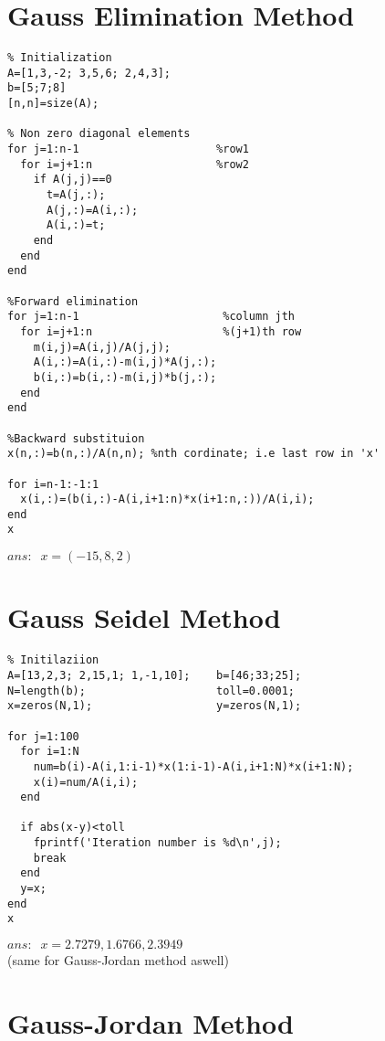 \section{Gauss Elimination Method}

\begin{verbatim}
% Initialization
A=[1,3,-2; 3,5,6; 2,4,3];
b=[5;7;8]
[n,n]=size(A);

% Non zero diagonal elements
for j=1:n-1                     %row1
  for i=j+1:n                   %row2
    if A(j,j)==0
      t=A(j,:);
      A(j,:)=A(i,:);
      A(i,:)=t;
    end
  end
end

%Forward elimination
for j=1:n-1                      %column jth
  for i=j+1:n                    %(j+1)th row
    m(i,j)=A(i,j)/A(j,j);
    A(i,:)=A(i,:)-m(i,j)*A(j,:);
    b(i,:)=b(i,:)-m(i,j)*b(j,:);
  end
end

%Backward substituion
x(n,:)=b(n,:)/A(n,n); %nth cordinate; i.e last row in 'x'

for i=n-1:-1:1
  x(i,:)=(b(i,:)-A(i,i+1:n)*x(i+1:n,:))/A(i,i);
end
x

\end{verbatim}
\(ans:\;\;x=(-15,8,2)\)

\section{Gauss Seidel Method}

\begin{verbatim}
% Initilaziion
A=[13,2,3; 2,15,1; 1,-1,10];    b=[46;33;25];
N=length(b);                    toll=0.0001;
x=zeros(N,1);                   y=zeros(N,1);

for j=1:100
  for i=1:N
    num=b(i)-A(i,1:i-1)*x(1:i-1)-A(i,i+1:N)*x(i+1:N);
    x(i)=num/A(i,i);
  end

  if abs(x-y)<toll
    fprintf('Iteration number is %d\n',j);
    break
  end
  y=x;
end
x

\end{verbatim}
\(ans:\;\;x =2.7279,1.6766,2.3949\)\\
(same for Gauss-Jordan method aswell)

\section{Gauss-Jordan Method}


